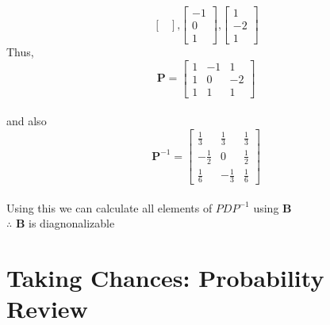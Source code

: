 \begin{itemize}
{\[\begin{bmatrix}
                \end{bmatrix}
                \text{,}
                \begin{bmatrix}
                    -1 \\ 0 \\ 1
                \end{bmatrix}
                \text{,}
                \begin{bmatrix}
                    1 \\ -2 \\ 1
                \end{bmatrix}
            \]
            Thus,
                \[
                \textbf{P} = \begin{bmatrix}
                    1 & -1 & 1 \\
                    1 & 0 & -2 \\
                    1 & 1 & 1
                \end{bmatrix}
                \]
                \\and also\\
                \[
                \textbf{P}^{-1} = \begin{bmatrix}
                    \frac{1}{3} & \frac{1}{3} & \frac{1}{3} \\
                    -\frac{1}{2} & 0 & \frac{1}{2} \\
                    \frac{1}{6} & -\frac{1}{3} & \frac{1}{6}
                \end{bmatrix}
                \]
            \\
            Using this we can calculate all elements of $PDP^{-1}$ using \textbf{B}\\
            $\therefore$ \textbf{B} is diagnonalizable
        }
    \end{itemize}

    \newpage

    \section{Taking Chances: Probability Review}


